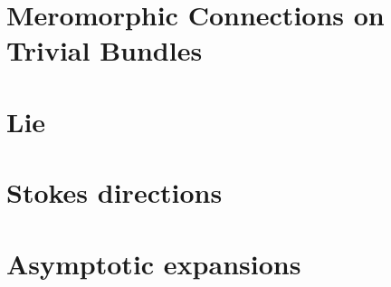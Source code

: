 \documentclass[ngerman
  ,numbers=noenddot %
]{./myBeamerClass}
\begin{document}
\section{Meromorphic Connections on Trivial Bundles}


\section{Lie}


\section{Stokes directions}


\section{Asymptotic expansions}


\printbibliography[keyword={prim},title={Literatur}]
\printbibliography[notkeyword={prim},title={Weitere Literatur}]
\end{document}
